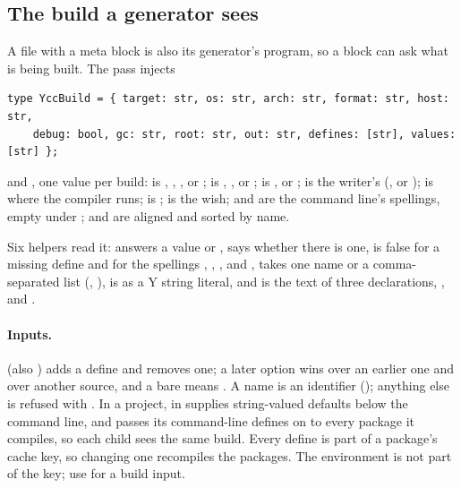 \subsection{The build a generator sees}
\label{sec:ycc}

A file with a meta block is also its generator's program, so a block can ask
what is being built. The pass injects

\begin{lstlisting}
type YccBuild = { target: str, os: str, arch: str, format: str, host: str,
    debug: bool, gc: str, root: str, out: str, defines: [str], values: [str] };
\end{lstlisting}

\noindent and , one value per build:  is
, , ,  or ;
 is , ,  or ;  is
,  or ;  is the writer's
(,  or );  is where the compiler runs;
 is ;  is the  wish;  and
 are the command line's spellings, empty under ;
 and  are aligned and sorted by name.

Six helpers read it:  answers a value or
,  says whether there is one,
 is false for a missing define and for the
spellings , , ,  and ,
 takes one name or a comma-separated
list (, ),  is
 as a Y string literal, and  is the text of
three declarations, ,  and
.

\paragraph{Inputs.}  (also ) adds a
define and  removes one; a later option wins over an earlier
one and over another source, and a bare  means . A name
is an identifier (\ic{[A-Za-z\_][A-Za-z0-9\_]*}); anything else is refused
with . In a project,
\ic{[defines]} in  supplies string-valued defaults below the
command line, and  passes its command-line defines on to every
package it compiles, so each child sees the same build. Every define is part
of a package's cache key, so changing one recompiles the packages. The environment is not
part of the key; use  for a build input.

